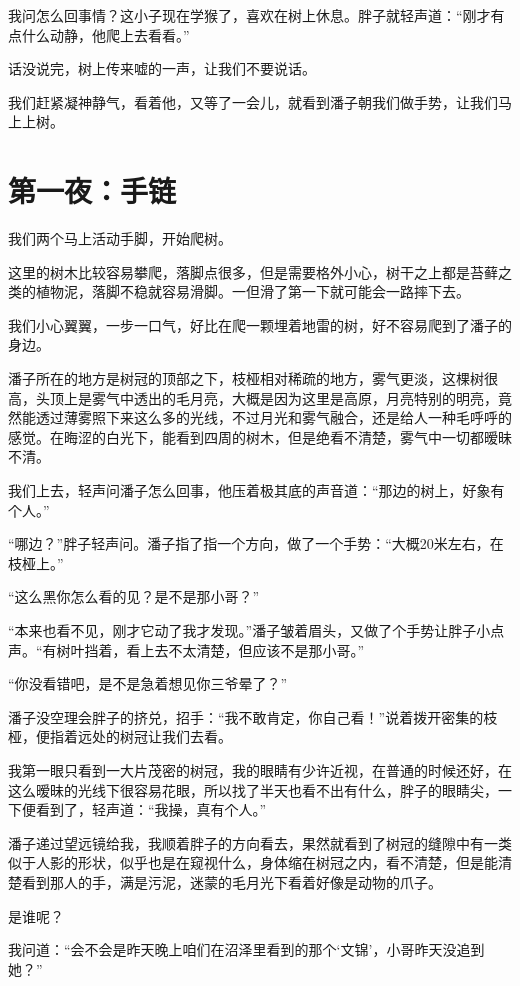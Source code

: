 我问怎么回事情？这小子现在学猴了，喜欢在树上休息。胖子就轻声道：“刚才有点什么动静，他爬上去看看。”

话没说完，树上传来嘘的一声，让我们不要说话。

我们赶紧凝神静气，看着他，又等了一会儿，就看到潘子朝我们做手势，让我们马上上树。

\chapter{第一夜：手链}

我们两个马上活动手脚，开始爬树。

这里的树木比较容易攀爬，落脚点很多，但是需要格外小心，树干之上都是苔藓之类的植物泥，落脚不稳就容易滑脚。一但滑了第一下就可能会一路摔下去。

我们小心翼翼，一步一口气，好比在爬一颗埋着地雷的树，好不容易爬到了潘子的身边。

潘子所在的地方是树冠的顶部之下，枝桠相对稀疏的地方，雾气更淡，这棵树很高，头顶上是雾气中透出的毛月亮，大概是因为这里是高原，月亮特别的明亮，竟然能透过薄雾照下来这么多的光线，不过月光和雾气融合，还是给人一种毛呼呼的感觉。在晦涩的白光下，能看到四周的树木，但是绝看不清楚，雾气中一切都暧昧不清。

我们上去，轻声问潘子怎么回事，他压着极其底的声音道：“那边的树上，好象有个人。”

“哪边？”胖子轻声问。潘子指了指一个方向，做了一个手势：“大概20米左右，在枝桠上。”

“这么黑你怎么看的见？是不是那小哥？”

“本来也看不见，刚才它动了我才发现。”潘子皱着眉头，又做了个手势让胖子小点声。“有树叶挡着，看上去不太清楚，但应该不是那小哥。”

“你没看错吧，是不是急着想见你三爷晕了？”

潘子没空理会胖子的挤兑，招手：“我不敢肯定，你自己看！”说着拨开密集的枝桠，便指着远处的树冠让我们去看。

我第一眼只看到一大片茂密的树冠，我的眼睛有少许近视，在普通的时候还好，在这么暧昧的光线下很容易花眼，所以找了半天也看不出有什么，胖子的眼睛尖，一下便看到了，轻声道：“我操，真有个人。”

潘子递过望远镜给我，我顺着胖子的方向看去，果然就看到了树冠的缝隙中有一类似于人影的形状，似乎也是在窥视什么，身体缩在树冠之内，看不清楚，但是能清楚看到那人的手，满是污泥，迷蒙的毛月光下看着好像是动物的爪子。

是谁呢？

我问道：“会不会是昨天晚上咱们在沼泽里看到的那个‘文锦’，小哥昨天没追到她？”

